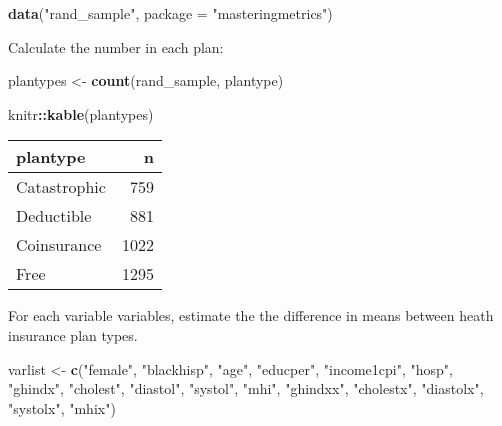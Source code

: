 \documentclass[]{book}
\newenvironment{Shaded}{\begin{snugshade}}{\end{snugshade}}
\newcommand{\KeywordTok}[1]{\textcolor[rgb]{0.13,0.29,0.53}{\textbf{#1}}}
\newcommand{\DataTypeTok}[1]{\textcolor[rgb]{0.13,0.29,0.53}{#1}}
\newcommand{\StringTok}[1]{\textcolor[rgb]{0.31,0.60,0.02}{#1}}
\newcommand{\OperatorTok}[1]{\textcolor[rgb]{0.81,0.36,0.00}{\textbf{#1}}}
\newcommand{\NormalTok}[1]{#1}
\theoremstyle{definition}
\theoremstyle{definition}
\theoremstyle{definition}
\theoremstyle{remark}
\begin{document}
\begin{Shaded}
\begin{Highlighting}[]
\KeywordTok{data}\NormalTok{(}\StringTok{"rand_sample"}\NormalTok{, }\DataTypeTok{package =} \StringTok{"masteringmetrics"}\NormalTok{)}
\end{Highlighting}
\end{Shaded}

Calculate the number in each plan:

\begin{Shaded}
\begin{Highlighting}[]
\NormalTok{plantypes <-}\StringTok{ }\KeywordTok{count}\NormalTok{(rand_sample, plantype)}
\end{Highlighting}
\end{Shaded}

\begin{Shaded}
\begin{Highlighting}[]
\NormalTok{knitr}\OperatorTok{::}\KeywordTok{kable}\NormalTok{(plantypes)}
\end{Highlighting}
\end{Shaded}

\begin{tabular}{l|r}
\hline
plantype & n\\
\hline
Catastrophic & 759\\
\hline
Deductible & 881\\
\hline
Coinsurance & 1022\\
\hline
Free & 1295\\
\hline
\end{tabular}

For each variable variables, estimate the the difference in means
between heath insurance plan types.

\begin{Shaded}
\begin{Highlighting}[]
\NormalTok{varlist <-}\StringTok{ }\KeywordTok{c}\NormalTok{(}\StringTok{"female"}\NormalTok{, }\StringTok{"blackhisp"}\NormalTok{, }\StringTok{"age"}\NormalTok{, }\StringTok{"educper"}\NormalTok{,}
             \StringTok{"income1cpi"}\NormalTok{, }\StringTok{"hosp"}\NormalTok{, }\StringTok{"ghindx"}\NormalTok{, }\StringTok{"cholest"}\NormalTok{, }\StringTok{"diastol"}\NormalTok{,}
             \StringTok{"systol"}\NormalTok{, }\StringTok{"mhi"}\NormalTok{, }\StringTok{"ghindxx"}\NormalTok{,}
             \StringTok{"cholestx"}\NormalTok{, }\StringTok{"diastolx"}\NormalTok{, }\StringTok{"systolx"}\NormalTok{, }\StringTok{"mhix"}\NormalTok{)}
        
\end{Highlighting}
\end{Shaded}
\end{document}
